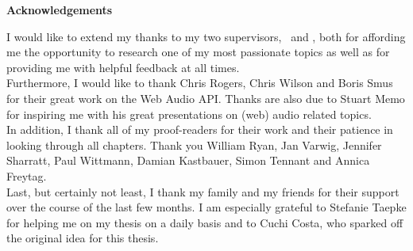 \noindent \textbf{Acknowledgements}
\thispagestyle{empty}
\vspace*{1cm}

\noindent I would like to extend my thanks to my two supervisors, \firstsupervisor \ and \secondsupervisor, both for affording me the opportunity to research one of my most passionate topics as well as for providing me with helpful feedback at all times.\\

\medskip
\noindent Furthermore, I would like to thank Chris Rogers, Chris Wilson and Boris Smus for their great work on the Web Audio API. Thanks are also due to Stuart Memo for inspiring me with his great presentations on (web) audio related topics.\\

\medskip
\noindent In addition, I thank all of my proof-readers for their work and their patience in looking through all chapters. Thank you William Ryan, Jan Varwig, Jennifer Sharratt, Paul Wittmann, Damian Kastbauer, Simon Tennant and Annica Freytag.\\

\medskip
\noindent Last, but certainly not least, I thank my family and my friends for their support over the course of the last few months. I am especially grateful to Stefanie Taepke for helping me on my thesis on a daily basis and to Cuchi Costa, who sparked off the original idea for this thesis.